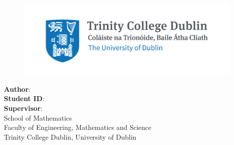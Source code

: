 \makeatletter
\begin{titlepage}
    \begin{center}
        \vspace*{1cm}

        \huge
        \textbf{\@title}

        \vspace{1cm}
        \LARGE
        \thesistype{}
        
		\vfill

        \begin{figure}[htbp]
             \centering
             \includegraphics[width=0.8\linewidth]{./Figures/logo2}
        \end{figure}
		
		\vfill

        \Large
        \textbf{Author}: \thesisauthor{} \\
        \textbf{Student ID}: \studentID{}\\
        \textbf{Supervisor}: \supervisor{}\\

        \vspace{1.5cm}
        School of Mathematics\\
        Faculty of Engineering, Mathematics and Science\\
        Trinity College Dublin, University of Dublin\\

        \vspace{1cm}
        \@date

    \end{center}
\end{titlepage}
\makeatother
